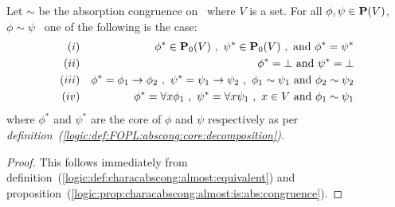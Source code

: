 \begin{theorem}\label{logic:the:characabscong:charac}
Let $\sim$ be the absorption congruence on \pv\ where $V$ is a set.
For all $\phi,\psi\in\mbox{${\bf P}(V)$}$, $\phi\sim\psi$ \ifand\ one of the
following is the case:
    \begin{eqnarray*}
    (i)&&\phi^{*}\in\pvo\ ,\ \psi^{*}\in\pvo\ ,\ \mbox{and}\ \phi^{*}=\psi^{*}\\
    (ii)&&\phi^{*}=\bot\ \mbox{and}\ \psi^{*}=\bot\\
    (iii)&&\phi^{*}=\phi_{1}\to\phi_{2}\ ,\ \psi^{*}=\psi_{1}\to\psi_{2}\ ,\
    \phi_{1}\sim\psi_{1}\ \mbox{and}\ \phi_{2}\sim\psi_{2}\\
    (iv)&&\phi^{*}=\forall x\phi_{1}\ ,\ \psi^{*}=\forall x\psi_{1}\ ,\ x\in V\ \mbox{and}\ \phi_{1}\sim\psi_{1}\\
    \end{eqnarray*}
where $\phi^{*}$ and $\psi^{*}$ are the core of $\phi$ and $\psi$
respectively as per {\em
definition~(\ref{logic:def:FOPL:abscong:core:decomposition})}.
\end{theorem}
\begin{proof}
This follows immediately from
definition~(\ref{logic:def:characabscong:almost:equivalent}) and
proposition~(\ref{logic:prop:characabscong:almost:is:abs:congruence}).
\end{proof}
